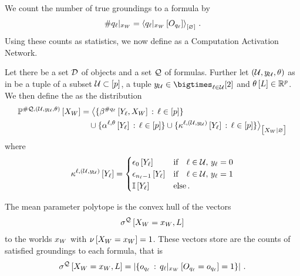 We count the number of true groundings to a formula by
\begin{align*}
    \#q_{\ell}|_{x_{W}}
    = \left\langle {q_{\ell}}|_{x_{W}} \left[O_{q_{\ell}}\right]\right\rangle_{\left[ \varnothing \right]} \, .
\end{align*}
Using these counts as statistics, we now define \HybridFOLNetworks{} as a Computation Activation Network.

\begin{definition}
    Let there be a set $\mathcal{D}$ of objects and a set $\mathcal{Q}$ of \firstOrderLogic{} formulas.
    Further let $(\mathcal{U},y_{\mathcal{U}},\theta)$ as in  be a tuple of a subset $\mathcal{U}\subset[p]$, a tuple $\headindexof{\hardlegset}\in\bigtimes_{\selindex\in\hardlegset}[2]$ and $\theta\left[L\right]\in\mathbb{R}^{p}$.
    We then define the \HybridFOLNetwork{} as the distribution
    \begin{align*}
        \probofat{\folhlnparameters}{\worldvariables}
        &= \breakablenormalizationof{\{\bencodingofat{\countquantifier\enumfolformula}{\headvariableof{\selindex},\worldvariables}\wcols\selindexin\} \\
        & \quad \cup \{\softactlegwith\wcols\selindexin\}
        \cup \{\kcoreofat{\selindex,\hardparam}{\headvariableof{\selindex}}\wcols\selindexin\}
        }{\worldvariables}
    \end{align*}
    where
    \begin{align*}
        \kappa^{\ell,(\mathcal{U},y_{\mathcal{U}})}\left[Y_{\ell}\right]
        = \begin{cases}
              \epsilon_{0}\left[Y_{\ell}\right] & \text{if}\quad \ell\in\mathcal{U} ,\, y_{\ell} = 0 \\
              \epsilon_{n_{\ell}-1}\left[Y_{\ell}\right] & \text{if}\quad \ell\in\mathcal{U} ,\, y_{\ell} = 1 \\
              \mathbb{I}\left[Y_{\ell}\right] & \text{else} \, .
        \end{cases}
    \end{align*}
\end{definition}



The mean parameter polytope is the convex hull of the vectors
\begin{align*}
    \sigma^{\mathcal{Q}}\left[X_{W}=x_{W},L\right]
\end{align*}
to the worlds $x_{W}$ with $\nu\left[X_{W}=x_{W}\right]=1$.
These vectors store are the counts of satisfied groundings to each formula, that is
\begin{align*}
    \sigma^{\mathcal{Q}}\left[X_{W}=x_{W},L\right] = \left|
        \{o_{q_{\ell}} \,:\, {q_{\ell}}|_{x_{W}} \left[O_{q_{\ell}}=o_{q_{\ell}}\right] = 1 \}
    \right| \, .
\end{align*}

